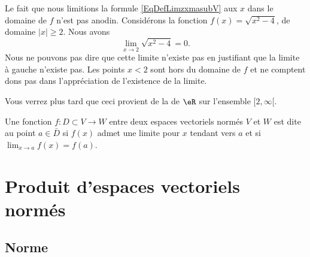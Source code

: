 \begin{remark}
    Le fait que nous limitions la formule \eqref{EqDefLimzxmasubV} aux \( x\) dans le domaine de \( f\) n'est pas anodin. Considérons la fonction \( f(x)=\sqrt{x^2-4}\), de domaine \( | x |\geq 2\). Nous avons
    \begin{equation}
        \lim_{x\to 2} \sqrt{x^2-4}=0.
    \end{equation}
    Nous ne pouvons pas dire que cette limite n'existe pas en justifiant que la limite à gauche n'existe pas. Les points \( x<2\) sont hors du domaine de \( f\) et ne comptent dons pas dans l'appréciation de l'existence de la limite.

    Vous verrez plus tard que ceci provient de la  de \( \eR\) sur l'ensemble \( \mathopen[ 2 , \infty [\).
\end{remark}

\begin{definition}\label{DefContDansEVN}
	Une fonction $f\colon D\subset V\to W$ entre deux espaces vectoriels normés $V$ et $W$ est dite  au point $a\in\bar D$ si $f(x)$ admet une limite pour $x$ tendant vers $a$ et si $\lim_{x\to a} f(x)=f(a)$.
\end{definition}



\section{Produit d'espaces vectoriels normés}\label{sec_prod}

\subsection{Norme}

